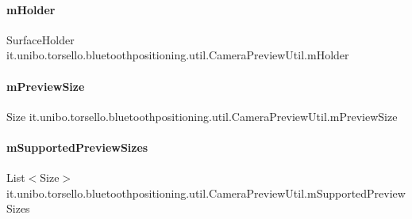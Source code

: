 \paragraph{\texorpdfstring{m\+Holder}{mHolder}}
{\footnotesize\ttfamily Surface\+Holder it.\+unibo.\+torsello.\+bluetoothpositioning.\+util.\+Camera\+Preview\+Util.\+m\+Holder\hspace{0.3cm}{\ttfamily [private]}}

\hypertarget{classit_1_1unibo_1_1torsello_1_1bluetoothpositioning_1_1util_1_1CameraPreviewUtil_a48550a4bc1d9358ae5de55f1109a2966_a48550a4bc1d9358ae5de55f1109a2966}{}\label{classit_1_1unibo_1_1torsello_1_1bluetoothpositioning_1_1util_1_1CameraPreviewUtil_a48550a4bc1d9358ae5de55f1109a2966_a48550a4bc1d9358ae5de55f1109a2966} 
\paragraph{\texorpdfstring{m\+Preview\+Size}{mPreviewSize}}
{\footnotesize\ttfamily Size it.\+unibo.\+torsello.\+bluetoothpositioning.\+util.\+Camera\+Preview\+Util.\+m\+Preview\+Size\hspace{0.3cm}{\ttfamily [private]}}

\hypertarget{classit_1_1unibo_1_1torsello_1_1bluetoothpositioning_1_1util_1_1CameraPreviewUtil_a4aeb809017d527738a2b2be1ebe2cb39_a4aeb809017d527738a2b2be1ebe2cb39}{}\label{classit_1_1unibo_1_1torsello_1_1bluetoothpositioning_1_1util_1_1CameraPreviewUtil_a4aeb809017d527738a2b2be1ebe2cb39_a4aeb809017d527738a2b2be1ebe2cb39} 
\paragraph{\texorpdfstring{m\+Supported\+Preview\+Sizes}{mSupportedPreviewSizes}}
{\footnotesize\ttfamily List$<$Size$>$ it.\+unibo.\+torsello.\+bluetoothpositioning.\+util.\+Camera\+Preview\+Util.\+m\+Supported\+Preview\+Sizes\hspace{0.3cm}{\ttfamily [private]}}

